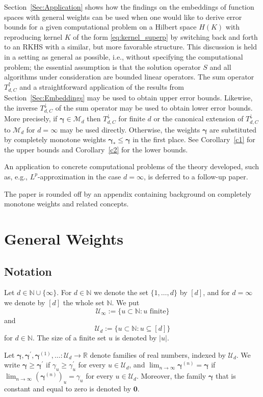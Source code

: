 \documentclass{article}
\newcommand{\R}  {{\mathbb R}}
\newcommand{\N}  {{\mathbb N}}
\newcommand{\bg}{{\boldsymbol{\gamma}}}
\newcommand{\bn}{{\boldsymbol{0}}}
\newcommand{\U}  {\mathcal{U}}
\newcommand{\M}  {\mathcal{M}}
\newcommand{\lo}{\downarrow}
\newcommand{\up}{\uparrow}
\theoremstyle{plain}
\theoremstyle{definition}
\begin{document}
Section~\ref{Sec:Application} shows how the findings on the 
embeddings of function spaces with general 
weights can be used when one 
would like to derive error bounds for a given computational problem 
on a Hilbert space $H(K)$ with reproducing kernel $K$ of the 
form \eqref{eq:kernel_superp} by switching back and forth to an 
RKHS with a similar, but more favorable structure.
This discussion is held in a setting as general as possible, i.e., 
without specifying the computational problem; 
the essential assumption is that the solution operator $S$ and 
all algorithms under consideration are bounded linear operators. 
The sum operator $T^\up_{d, C}$ and a straightforward 
application of the results from Section~\ref{Sec:Embeddings} may be 
used to obtain upper error bounds. Likewise, the inverse 
$T^\lo_{d, C}$ of the sum operator may be used to obtain
lower error bounds. More precisely, if $\bg \in \M_d$ then
$T^\lo_{d, C}$ for finite $d$ or the 
canonical extension of $T^\lo_{d, C}$ to $\M_d$ for $d=\infty$
may be used directly.
Otherwise, the weights $\bg$ are substituted by completely monotone
weights $\bg_\ast \leq \bg$ in the first place.
See Corollary~\ref{c1} for the upper bounds and 
Corollary~\ref{c2} for the lower bounds.

An application to concrete computational problems of the theory 
developed, such as, e.g., $L^p$-approximation in the case 
$d=\infty$, is deferred to a follow-up paper.

The paper is rounded off by an appendix containing 
background on completely monotone weights and related concepts.


\section{General Weights}\label{sec:weights}


\subsection{Notation}\label{sec:notation}

Let $d\in \N \cup \{\infty\}$.
For $d\in\N$ we denote the set $\{1,\ldots,d\}$ by $[d]$, and for 
$d=\infty$ we denote by $[d]$ the whole set $\N$. We put 
\[
\U_{\infty} := \{u\subset \N : \text{$u$ finite} 
\} 
\] 
and 
\[
\U_d := \{u \subset \N : u \subseteq [d] \}
\]
for $d \in \N$. The size of a finite set $u$ is denoted by $|u|$. 

Let $\bg, \bg^\prime, \bg^{(1)}, \ldots \colon \U_d \to \R $ 
denote families of real numbers, indexed by $\U_d$. We write $\bg \geq
\bg^\prime$ if $\gamma_u \geq \gamma^\prime_u$ for every $u \in
\U_d$, and $\lim_{n \to \infty} \bg^{(n)} = \bg$ 
if $\lim_{n \to \infty} \left(\bg^{(n)}\right)_u = \gamma_u$ for 
every $u \in \U_d$. Moreover, the family $\bg$ that is constant 
and equal to zero is denoted by $\bn$.
\end{document}
